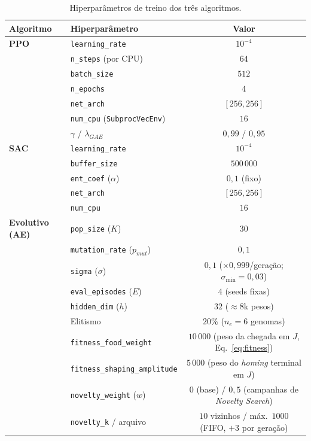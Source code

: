 \documentclass[12pt,reqno, twoside]{amsbook}
\theoremstyle{plain}
\numberwithin{equation}{chapter}
\numberwithin{section}{chapter}
\numberwithin{table}{chapter}
\numberwithin{figure}{chapter}
\begin{document}
\begin{table}[!htbp]
\centering
\footnotesize
\renewcommand{\arraystretch}{1.15}
\caption[Hiperparâmetros de treino dos três algoritmos]{Hiperparâmetros de treino dos três algoritmos.}
\label{tab:apx_train}
\begin{tabular}{|l|l|c|}
\hline
\textbf{Algoritmo} & \textbf{Hiperparâmetro} & \textbf{Valor} \\ \hline
\textbf{PPO} & \texttt{learning\_rate} & $10^{-4}$ \\
 & \texttt{n\_steps} (por CPU) & $64$ \\
 & \texttt{batch\_size} & $512$ \\
 & \texttt{n\_epochs} & $4$ \\
 & \texttt{net\_arch} & $[256, 256]$ \\
 & \texttt{num\_cpu} (\texttt{SubprocVecEnv}) & $16$ \\
 & $\gamma$ / $\lambda_{GAE}$ & $0{,}99$ / $0{,}95$ \\ \hline
\textbf{SAC} & \texttt{learning\_rate} & $10^{-4}$ \\
 & \texttt{buffer\_size} & $500\,000$ \\
 & \texttt{ent\_coef} ($\alpha$) & $0{,}1$ (fixo) \\
 & \texttt{net\_arch} & $[256, 256]$ \\
 & \texttt{num\_cpu} & $16$ \\ \hline
\textbf{Evolutivo (AE)} & \texttt{pop\_size} ($K$) & $30$ \\
 & \texttt{mutation\_rate} ($p_{mut}$) & $0{,}1$ \\
 & \texttt{sigma} ($\sigma$) & $0{,}1$ ($\times 0{,}999$/geração; $\sigma_{\min}=0{,}03$) \\
 & \texttt{eval\_episodes} ($E$) & $4$ (seeds fixas) \\
 & \texttt{hidden\_dim} ($h$) & $32$ ($\approx 8$k pesos) \\
 & Elitismo & $20\%$ ($n_e = 6$ genomas) \\
 & \texttt{fitness\_food\_weight} & $10\,000$ (peso da chegada em $J$, Eq.~\ref{eq:fitness}) \\
 & \texttt{fitness\_shaping\_amplitude} & $5\,000$ (peso do \textit{homing} terminal em $J$) \\
 & \texttt{novelty\_weight} ($w$) & $0$ (base) / $0{,}5$ (campanhas de \textit{Novelty Search}) \\
 & \texttt{novelty\_k} / arquivo & $10$ vizinhos / máx.\ $1000$ (FIFO, $+3$ por geração) \\ \hline
\end{tabular}
\end{table}
\end{document}
